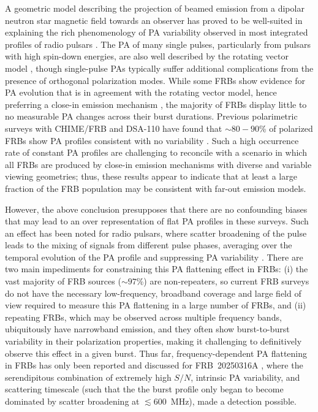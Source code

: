 \documentclass[twocolumn, linenumbers]{aastex701}
\begin{document}
A geometric model describing the projection of beamed emission from a dipolar neutron star magnetic field towards an observer \citep[i.e., the ``rotating vector model'';][]{1969ApL.....3..225R} has proved to be well-suited in explaining the rich phenomenology of PA variability observed in most integrated profiles of radio pulsars \citep[e.g.,][]{2023MNRAS.520.4801J, 2024MNRAS.530.4839J}. The PA of many single pulses, particularly from pulsars with high spin-down energies, are also well described by the rotating vector model \citep{2016ApJ...833...28M, 2023ApJ...952..151M}, though single-pulse PAs typically suffer additional complications from the presence of orthogonal polarization modes. While some FRBs show evidence for PA evolution that is in agreement with the rotating vector model, hence preferring a close-in emission mechanism \citep{2025Natur.637...43M}, the majority of FRBs display little to no measurable PA changes across their burst durations. Previous polarimetric surveys with CHIME/FRB and DSA-110 have found that $\sim 80-90$\% of polarized FRBs show PA profiles consistent with no variability \citep{2024ApJ...968...50P, 2024ApJ...964..131S}. Such a high occurrence rate of constant PA profiles are challenging to reconcile with a scenario in which all FRBs are produced by close-in emission mechanisms with diverse and variable viewing geometries; thus, these results appear to indicate that at least a large fraction of the FRB population may be consistent with far-out emission models.

However, the above conclusion presupposes that there are no confounding biases that may lead to an over representation of flat PA profiles in these surveys. Such an effect has been noted for radio pulsars, where scatter broadening of the pulse leads to the mixing of signals from different pulse phases, averaging over the temporal evolution of the PA profile and suppressing PA variability \citep[e.g., ][]{2003A&A...410..253L, 2023RAA....23j4002W, 2025arXiv250614519J}. There are two main impediments for constraining this PA flattening effect in FRBs: (i) the vast majority of FRB sources ($\sim 97$\%) are non-repeaters, so current FRB surveys do not have the necessary low-frequency, broadband coverage and large field of view required to measure this PA flattening in a large number of FRBs, and (ii) repeating FRBs, which may be observed across multiple frequency bands, ubiquitously have narrowband emission, and they often show burst-to-burst variability in their polarization properties, making it challenging to definitively observe this effect in a given burst. Thus far, frequency-dependent PA flattening in FRBs has only been reported and discussed for FRB~20250316A \citep{2025ApJ...989L..48C}, where the serendipitous combination of extremely high $S/N$, intrinsic PA variability, and scattering timescale (such that the the burst profile only began to become dominated by scatter broadening at $\lesssim 600$~MHz), made a detection possible.
\end{document}
